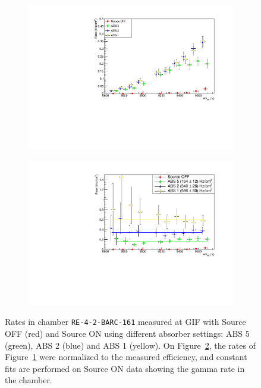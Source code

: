 	\begin{figure}[H]
    	\begin{subfigure}{0.5\linewidth}
			\centering
			\includegraphics[width = 0.7\plotwidth]{fig/chapt5/Gamma-Rate.pdf}
        	\caption{\label{fig:GIFRate:A}}
    	\end{subfigure}
    	\begin{subfigure}{0.5\linewidth}
			\centering
			\includegraphics[width = 0.7\plotwidth]{fig/chapt5/Unconvoluted-Gamma-Rate.pdf}
        	\caption{\label{fig:GIFRate:B}}
    	\end{subfigure}
		\caption{\label{fig:GIFRate} Rates in chamber \texttt{RE-4-2-BARC-161} measured at GIF with Source OFF (red) and Source ON using different absorber settings: ABS 5 (green), ABS 2 (blue) and ABS 1 (yellow). On Figure~\ref{fig:GIFRate:B}, the rates of Figure~\ref{fig:GIFRate:A} were normalized to the measured efficiency, and constant fits are performed on Source ON data showing the gamma rate in the chamber.}
	\end{figure}
	
